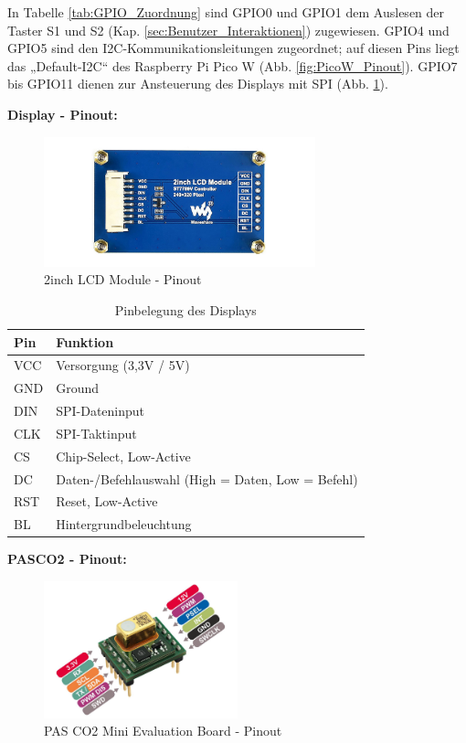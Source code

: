 \begin{inhalt}
In Tabelle \ref{tab:GPIO_Zuordnung} sind GPIO0 und GPIO1 dem Auslesen der Taster S1 und S2 (Kap. \ref{sec:Benutzer_Interaktionen}) zugewiesen. GPIO4 und GPIO5 sind den I2C-Kommunikationsleitungen zugeordnet; auf diesen Pins liegt das „Default-I2C“ des Raspberry Pi Pico W (Abb. \ref{fig:PicoW_Pinout}). GPIO7 bis GPIO11 dienen zur Ansteuerung des Displays mit SPI (Abb. \ref{fig:Display_Pinout}).

\clearpage

\textbf{Display - Pinout:}

\begin{figure}[!htb]
\centering
\includegraphics[width=0.7\textwidth]{files/Tobias/pics/Pinout/2inch-LCD-Module-4_960.jpg}
\caption[Display - Pinout]{2inch LCD Module - Pinout}
\label{fig:Display_Pinout}
\end{figure}


\begin{table}[H]
\centering
\begin{tabular}{|l|l|}
\hline
\rowcolor{cyan!20}
\textbf{Pin} & \textbf{Funktion} \\
\hline
VCC & Versorgung (3{,}3V / 5V) \\
\hline
GND & Ground \\
\hline
DIN & SPI-Dateninput \\
\hline
CLK & SPI-Taktinput \\
\hline
CS & Chip-Select, Low-Active \\
\hline
DC & Daten-/Befehlauswahl (High = Daten, Low = Befehl) \\
\hline
RST & Reset, Low-Active \\
\hline
BL & Hintergrundbeleuchtung \\
\hline
\end{tabular}
\caption{Pinbelegung des Displays}
\label{tab:display_pins}
\end{table}



\textbf{PASCO2 - Pinout:}

\begin{figure}[!htb]
\centering
\includegraphics[width=0.5\textwidth]{files/Tobias/pics/Pinout/minieval_co2_pinout.pdf}
\caption[Display - Pinout]{PAS CO2 Mini Evaluation Board - Pinout}
\label{fig:PASCO2_Pinout}
\end{figure}


\end{inhalt}
